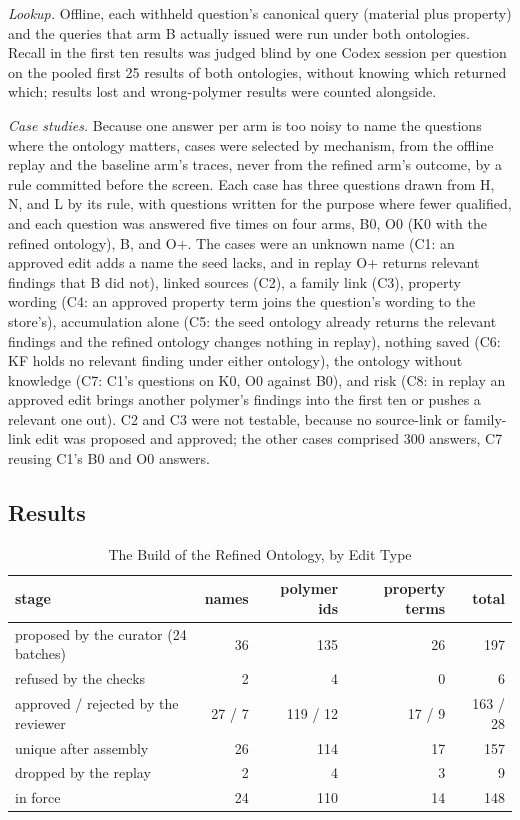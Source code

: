 \documentclass[journal=mamobx,manuscript=suppinfo]{achemso}
\begin{document}
\emph{Lookup.}
Offline, each withheld question's canonical query (material plus property) and the queries that arm B actually issued were run under both ontologies.
Recall in the first ten results was judged blind by one Codex session per question on the pooled first 25 results of both ontologies, without knowing which returned which; results lost and wrong-polymer results were counted alongside.

\emph{Case studies.}
Because one answer per arm is too noisy to name the questions where the ontology matters, cases were selected by mechanism, from the offline replay and the baseline arm's traces, never from the refined arm's outcome, by a rule committed before the screen.
Each case has three questions drawn from H, N, and L by its rule, with questions written for the purpose where fewer qualified, and each question was answered five times on four arms, B0, O0 (K0 with the refined ontology), B, and O+.
The cases were an unknown name (C1: an approved edit adds a name the seed lacks, and in replay O+ returns relevant findings that B did not), linked sources (C2), a family link (C3), property wording (C4: an approved property term joins the question's wording to the store's), accumulation alone (C5: the seed ontology already returns the relevant findings and the refined ontology changes nothing in replay), nothing saved (C6: KF holds no relevant finding under either ontology), the ontology without knowledge (C7: C1's questions on K0, O0 against B0), and risk (C8: in replay an approved edit brings another polymer's findings into the first ten or pushes a relevant one out).
C2 and C3 were not testable, because no source-link or family-link edit was proposed and approved; the other cases comprised 300 answers, C7 reusing C1's B0 and O0 answers.

\subsection{Results}

\begin{table}
  \caption{The Build of the Refined Ontology, by Edit Type}
  \label{tbl:build}
  \begin{tabular}{lrrrr}
    \toprule
    stage & names & polymer ids & property terms & total \\
    \midrule
    proposed by the curator (24 batches) & 36 & 135 & 26 & 197 \\
    refused by the checks & 2 & 4 & 0 & 6 \\
    approved / rejected by the reviewer & 27 / 7 & 119 / 12 & 17 / 9 & 163 / 28 \\
    unique after assembly & 26 & 114 & 17 & 157 \\
    dropped by the replay & 2 & 4 & 3 & 9 \\
    in force & 24 & 110 & 14 & 148 \\
    \bottomrule
  \end{tabular}
\end{table}
\end{document}
